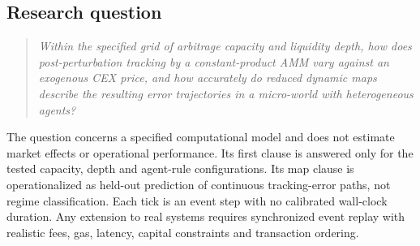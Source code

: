 \FloatBarrier
\begin{samepage}
\section{Research question}

\begin{quote}
\emph{Within the specified grid of arbitrage capacity and liquidity depth, how does post-perturbation tracking by a constant-product AMM vary against an exogenous CEX price, and how accurately do reduced dynamic maps describe the resulting error trajectories in a micro-world with heterogeneous agents?}
\end{quote}
\end{samepage}

The question concerns a specified computational model and does not estimate market effects or operational performance. Its first clause is answered only for the tested capacity, depth and agent-rule configurations. Its map clause is operationalized as held-out prediction of continuous tracking-error paths, not regime classification. Each tick is an event step with no calibrated wall-clock duration. Any extension to real systems requires synchronized event replay with realistic fees, gas, latency, capital constraints and transaction ordering.
